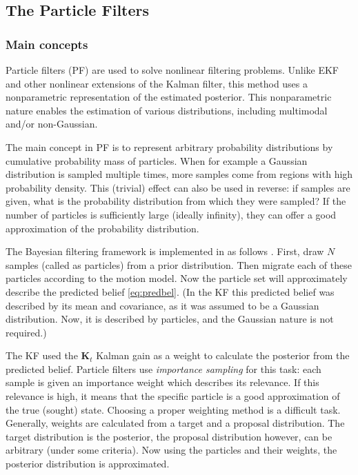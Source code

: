 \subsection{The Particle Filters}
\subsubsection{Main concepts}

Particle filters (PF) are used to solve nonlinear filtering problems. Unlike EKF and other nonlinear extensions of the Kalman filter, this method uses a nonparametric representation of the estimated posterior. This nonparametric nature enables the estimation of various distributions, including multimodal and/or non-Gaussian.

The main concept in PF is to represent arbitrary probability distributions by cumulative probability mass of particles. When for example a Gaussian distribution is sampled multiple times, more samples come from regions with high probability density. This (trivial) effect can also be used in reverse: if samples are given, what is the probability distribution from which they were sampled? If the number of particles is sufficiently large (ideally infinity), they can offer a good approximation of the probability distribution.

The Bayesian filtering framework is implemented in as follows . First, draw $N$ samples (called as particles) from a prior distribution. Then migrate each of these particles according to the motion model. Now the particle set will approximately describe the predicted belief \eqref{eq:predbel}. (In the KF this predicted belief was described by its mean and covariance, as it was assumed to be a Gaussian distribution. Now, it is described by particles, and the Gaussian nature is not required.)

The KF used the $\mathbf{K}_t$ Kalman gain as a weight to calculate the posterior from the predicted belief. Particle filters use \emph{importance sampling} for this task: each sample is given an importance weight which describes its relevance. If this relevance is high, it means that the specific particle is a good approximation of the true (sought) state. Choosing a proper weighting method is a difficult task. Generally, weights are calculated from a target and a proposal distribution. The target distribution is the posterior, the proposal distribution however, can be arbitrary (under some criteria). Now using the particles and their weights, the posterior distribution is approximated.

